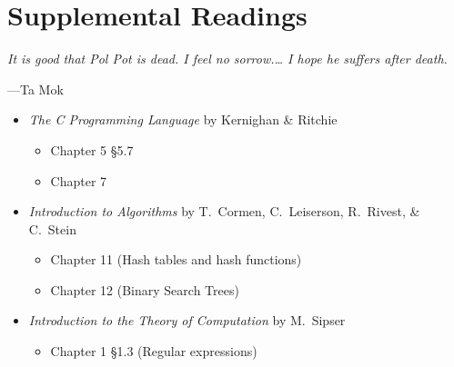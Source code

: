 \section{Supplemental Readings}

\epigraph{\emph{It is good that Pol Pot is dead. I feel no sorrow.\ldots
I hope he suffers after death.}}{---Ta Mok}

\noindent
\begin{itemize}
  \item \textit{The C Programming Language} by Kernighan \& Ritchie
  \begin{itemize}
    \item Chapter 5 \S 5.7
    \item Chapter 7
  \end{itemize}
  \item \textit{Introduction to Algorithms} by T.\ Cormen, C.\
    Leiserson, R.\ Rivest, \& C.\ Stein
    \begin{itemize}
      \item Chapter 11 (Hash tables and hash functions)
      \item Chapter 12 (Binary Search Trees)
    \end{itemize}
  \item \textit{Introduction to the Theory of Computation} by M.\ Sipser
    \begin{itemize}
      \item Chapter 1 \S 1.3 (Regular expressions)
    \end{itemize}
\end{itemize}
